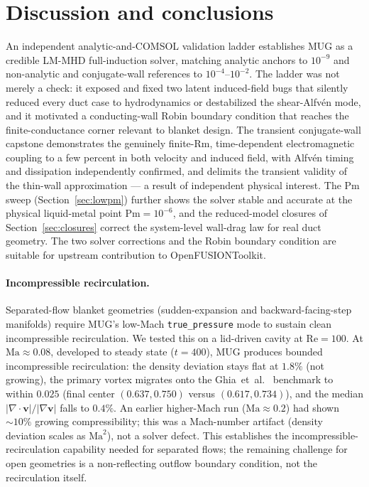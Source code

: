 \documentclass[11pt,letterpaper]{article}
\newcommand{\Rm}{\mathrm{Rm}}
\newcommand{\Pm}{\mathrm{Pm}}
\begin{document}
\section{Discussion and conclusions}
An independent analytic-and-COMSOL validation ladder establishes MUG as a credible
LM-MHD full-induction solver, matching analytic anchors to $10^{-9}$ and
non-analytic and conjugate-wall references to $10^{-4}$--$10^{-2}$. The ladder was
not merely a check: it exposed and fixed two latent induced-field bugs that
silently reduced every duct case to hydrodynamics or destabilized the shear-Alfv\'en
mode, and it motivated a conducting-wall Robin boundary condition that reaches the
finite-conductance corner relevant to blanket design. The transient conjugate-wall
capstone demonstrates the genuinely finite-$\Rm$, time-dependent electromagnetic
coupling to a few percent in both velocity and induced field, with Alfv\'en timing
and dissipation independently confirmed, and delimits the transient validity of the
thin-wall approximation --- a result of independent physical interest. The
$\Pm$ sweep (Section~\ref{sec:lowpm}) further shows the solver stable and accurate
at the physical liquid-metal point $\Pm=10^{-6}$, and the reduced-model closures of
Section~\ref{sec:closures} correct the system-level wall-drag law for real duct
geometry. The two solver corrections and the Robin boundary condition are suitable
for upstream contribution to OpenFUSIONToolkit.

\paragraph{Incompressible recirculation.} Separated-flow blanket geometries
(sudden-expansion and backward-facing-step manifolds) require MUG's low-Mach
\texttt{true\_pressure} mode to sustain clean incompressible recirculation. We
tested this on a lid-driven cavity at $\mathrm{Re}=100$. At $\mathrm{Ma}\approx0.08$,
developed to steady state ($t=400$), MUG produces bounded incompressible
recirculation: the density deviation stays flat at $1.8\%$ (not growing), the
primary vortex migrates onto the Ghia~et~al.~\cite{ghia1982} benchmark to within
$0.025$ (final center $(0.637,0.750)$ versus $(0.617,0.734)$), and the median
$|\nabla\!\cdot\!\mathbf{v}|/|\nabla\mathbf{v}|$ falls to $0.4\%$. An earlier
higher-Mach run ($\mathrm{Ma}\approx0.2$) had shown $\sim\!10\%$ growing
compressibility; this was a Mach-number artifact (density deviation scales as
$\mathrm{Ma}^2$), not a solver defect. This establishes the incompressible-recirculation
capability needed for separated flows; the remaining challenge for open geometries
is a non-reflecting outflow boundary condition, not the recirculation itself.
\end{document}
